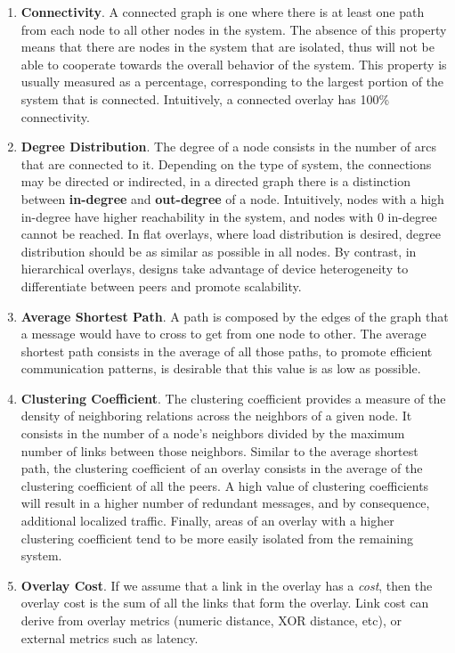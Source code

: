 \begin{enumerate}
    
    \item \textbf{Connectivity}. A connected graph is one where there is at least one path from each node to all other nodes in the system. The absence of this property means that there are nodes in the system that are isolated, thus will not be able to cooperate towards the overall behavior of the system. This property is usually measured as a percentage, corresponding to the largest portion of the system that is connected. Intuitively, a  connected overlay has 100\% connectivity.
    
    \item \textbf{Degree Distribution}. The degree of a node consists in the number of arcs that are connected to it. Depending on the type of system, the connections may be directed or indirected, in a directed graph there is a distinction between \textbf{in-degree} and \textbf{out-degree} of a node. Intuitively, nodes with a high in-degree have higher reachability in the system, and nodes with 0 in-degree cannot be reached. In flat overlays, where load distribution is desired, degree distribution should be as similar as possible in all nodes. By contrast, in hierarchical overlays,  designs take advantage of device heterogeneity to differentiate between peers and promote scalability.
    
    \item \textbf{Average Shortest Path}. A path is composed by the edges of the graph that a message would have to cross to get from one node to other. The average shortest path consists in the average of all those paths, to promote efficient communication patterns, is desirable that this value is as low as possible.
    
    \item \textbf{Clustering Coefficient}. The clustering coefficient provides a measure of the density of neighboring relations across the neighbors of a given node. It consists in the number of a node's neighbors divided by the maximum number of links between those neighbors. Similar to the average shortest path, the clustering coefficient of an overlay consists in the average of the clustering coefficient of all the peers. A high value of clustering coefficients will result in a higher number of redundant messages, and by consequence, additional localized traffic. Finally, areas of an overlay with a higher clustering coefficient tend to be more easily isolated from the remaining system.
    
    \item \textbf{Overlay Cost}. If we assume that a link in the overlay has a \textit{cost}, then the overlay cost is the sum of all the links that form the overlay. Link cost can derive from overlay metrics (numeric distance, XOR distance, etc), or external metrics such as latency.
    
\end{enumerate}

